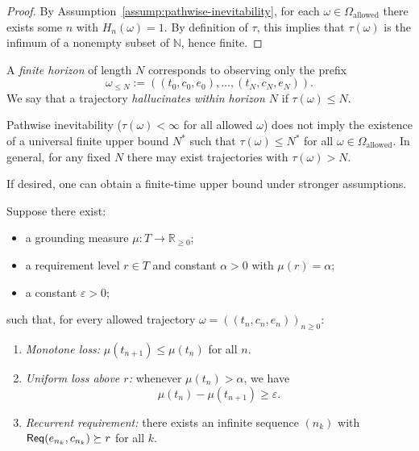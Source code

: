 \begin{proof}
By Assumption~\ref{assump:pathwise-inevitability}, for each
\(\omega\in\Omega_{\mathrm{allowed}}\) there exists some \(n\) with
\(H_n(\omega)=1\). By definition of \(\tau\), this implies that
\(\tau(\omega)\) is the infimum of a nonempty subset of \(\mathbb{N}\),
hence finite.
\end{proof}

A \emph{finite horizon} of length \(N\) corresponds to observing only
the prefix
\[
\omega_{\le N}
 :=
((t_0,c_0,e_0),\dots,(t_N,c_N,e_N)).
\]
We say that a trajectory \emph{hallucinates within horizon \(N\)} if
\(\tau(\omega)\le N\).

\begin{remark}
Pathwise inevitability (\(\tau(\omega) < \infty\) for all allowed
\(\omega\)) does not imply the existence of a universal finite upper
bound \(N^\ast\) such that \(\tau(\omega)\le N^\ast\) for all
\(\omega\in\Omega_{\mathrm{allowed}}\). In general, for any fixed
\(N\) there may exist trajectories with \(\tau(\omega) > N\).
\end{remark}


If desired, one can obtain a finite-time upper bound under stronger
assumptions.

\begin{assumption}
\label{assump:uniform-loss}
Suppose there exist:
\begin{itemize}
  \item a grounding measure \(\mu:T\to\mathbb{R}_{\ge 0}\);
  \item a requirement level \(r\in T\) and constant \(\alpha>0\) with
        \(\mu(r)=\alpha\);
  \item a constant \(\varepsilon>0\);
\end{itemize}
such that, for every allowed trajectory
\(\omega=((t_n,c_n,e_n))_{n\ge 0}\):
\begin{enumerate}
  \item \emph{Monotone loss:} \(\mu(t_{n+1})\le\mu(t_n)\) for all
        \(n\).
  \item \emph{Uniform loss above \(r\):} whenever \(\mu(t_n)>\alpha\),
        we have
        \[
        \mu(t_n) - \mu(t_{n+1}) \ge \varepsilon.
        \]
  \item \emph{Recurrent requirement:} there exists an infinite sequence
        \((n_k)\) with \(\mathsf{Req}(e_{n_k},c_{n_k})\succeq r\) for all
        \(k\).
\end{enumerate}
\end{assumption}

